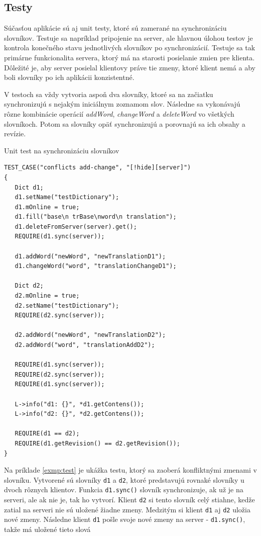 \documentclass[
  digital, %
  table,   %
  lof,     %
  lot,     %
]{fithesis3}
\begin{document}
\subsection{Testy}
Súčasťou aplikácie sú aj unit testy, ktoré sú zamerané na synchronizáciu slovníkov. Testuje sa napríklad pripojenie na server, ale hlavnou úlohou testov je kontrola konečného stavu jednotlivých slovníkov po synchronizácií. Testuje sa tak primárne funkcionalita servera, ktorý má na starosti posielanie zmien pre klienta. Dôležité je, aby server posielal klientovy práve tie zmeny, ktoré klient nemá a aby boli slovníky po ich aplikácii konzistentné.

V testoch sa vždy vytvoria aspoň dva slovníky, ktoré sa na začiatku synchronizujú s nejakým iniciálnym zoznamom slov. Následne sa vykonávajú rôzne kombinácie operácií \textit{addWord}, \textit{changeWord} a \textit{deleteWord} vo všetkých slovníkoch. Potom sa slovníky opäť synchronizujú a porovnajú sa ich obsahy a revízie.

\begin{exmp}
\label{exmp:test}
Unit test na synchronizáciu slovníkov
\centering
\begin{lstlisting}[basicstyle=\small]
TEST_CASE("conflicts add-change", "[!hide][server]")
{
   Dict d1;
   d1.setName("testDictionary");
   d1.mOnline = true;
   d1.fill("base\n trBase\nword\n translation");
   d1.deleteFromServer(server).get();
   REQUIRE(d1.sync(server));

   d1.addWord("newWord", "newTranslationD1");
   d1.changeWord("word", "translationChangeD1");

   Dict d2;
   d2.mOnline = true;
   d2.setName("testDictionary");
   REQUIRE(d2.sync(server));

   d2.addWord("newWord", "newTranslationD2");
   d2.addWord("word", "translationAddD2");

   REQUIRE(d1.sync(server));
   REQUIRE(d2.sync(server));
   REQUIRE(d1.sync(server));

   L->info("d1: {}", *d1.getContens());
   L->info("d2: {}", *d2.getContens());

   REQUIRE(d1 == d2);
   REQUIRE(d1.getRevision() == d2.getRevision());
}
\end{lstlisting}
\end{exmp}

Na príklade \ref{exmp:test} je ukážka testu, ktorý sa zaoberá konfliktnými zmenami v slovníku. Vytvorené sú slovníky \texttt{d1} a \texttt{d2}, ktoré predstavujú rovnaké slovníky u dvoch rôznych klientov. Funkcia \texttt{d1.sync()} slovník synchronizuje, ak už je na serveri, ale ak nie je, tak ho vytvorí. Klient \texttt{d2} si tento slovník celý stiahne, kedže zatial na serveri nie sú uložené žiadne zmeny. Medzitým si klient \texttt{d1} aj \texttt{d2} uložia nové zmeny. Následne klient \texttt{d1} pošle svoje nové zmeny na server - \texttt{d1.sync()}, takže má uložené tieto slová
\end{document}
